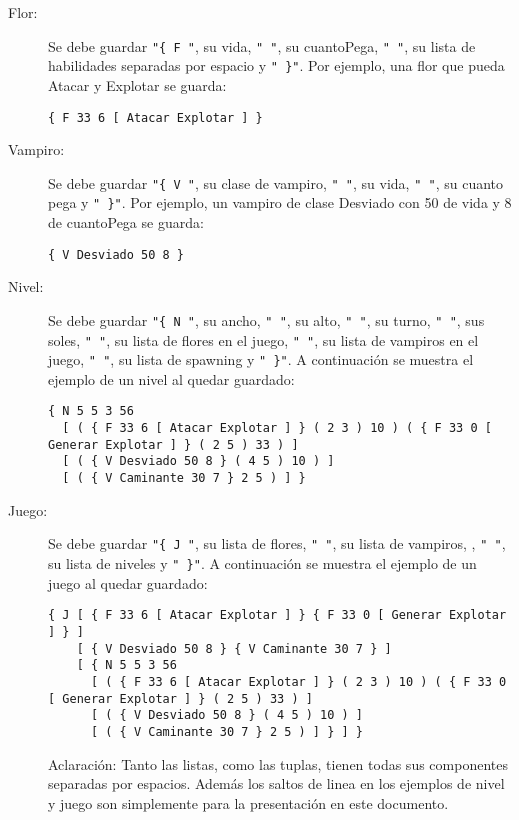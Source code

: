 \documentclass[spanish,a4paper]{article}
\begin{document}
\begin{description}
\item [Flor:] Se debe guardar \verb|"{ F "|, su vida, \verb|" "|,  su cuantoPega, \verb|" "|, su lista de habilidades separadas por espacio y \verb|" }"|. Por ejemplo, una flor que pueda Atacar y Explotar se guarda:
\begin{verbatim}
{ F 33 6 [ Atacar Explotar ] } 
\end{verbatim}

\item [Vampiro:] Se debe guardar \verb|"{ V "|, su clase de vampiro, \verb|" "|, su vida, \verb|" "|, su cuanto pega y \verb|" }"|. Por ejemplo, un vampiro de clase Desviado con 50 de vida y 8 de cuantoPega se guarda:
\begin{verbatim}
{ V Desviado 50 8 }
\end{verbatim}


\item [Nivel:] Se debe guardar \verb|"{ N "|, su ancho, \verb|" "|, su alto, \verb|" "|, su turno, \verb|" "|, sus soles,  \verb|" "|, su lista de flores en el juego, \verb|" "|, su lista de vampiros en el juego,  \verb|" "|, su lista de spawning y \verb|" }"|. 
A continuaci\'on se muestra el ejemplo de un nivel al quedar guardado:

\begin{verbatim}
{ N 5 5 3 56 
  [ ( { F 33 6 [ Atacar Explotar ] } ( 2 3 ) 10 ) ( { F 33 0 [ Generar Explotar ] } ( 2 5 ) 33 ) ]
  [ ( { V Desviado 50 8 } ( 4 5 ) 10 ) ] 
  [ ( { V Caminante 30 7 } 2 5 ) ] } 
\end{verbatim}


\item [Juego:] Se debe guardar \verb|"{ J "|, su lista de flores, \verb|" "|, su lista de vampiros, , \verb|" "|, su lista de niveles y \verb|" }"|.
A continuaci\'on se muestra el ejemplo de un juego al quedar guardado:
\begin{verbatim}
{ J [ { F 33 6 [ Atacar Explotar ] } { F 33 0 [ Generar Explotar ] } ]
    [ { V Desviado 50 8 } { V Caminante 30 7 } ]
    [ { N 5 5 3 56 
      [ ( { F 33 6 [ Atacar Explotar ] } ( 2 3 ) 10 ) ( { F 33 0 [ Generar Explotar ] } ( 2 5 ) 33 ) ]
      [ ( { V Desviado 50 8 } ( 4 5 ) 10 ) ] 
      [ ( { V Caminante 30 7 } 2 5 ) ] } ] }
\end{verbatim}



Aclaraci\'on: Tanto las listas, como las tuplas, tienen todas sus componentes separadas por espacios. Adem\'as los saltos de linea en los ejemplos de nivel y juego son simplemente para la presentaci\'on en este documento.

\end{description}
\end{document}
